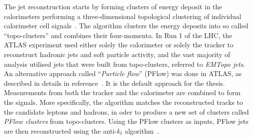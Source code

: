 The jet reconstruction starts by forming clusters of energy deposit
in the calorimeters performing a three-dimensional topological clustering 
of individual calorimeter cell signals~\cite{Aad_2017}.
The algorithm clusters the energy deposits into so called ``topo-clusters'' 
and combines their four-momenta. 
In Run 1 of the LHC, the ATLAS experiment used either
solely the calorimeter or solely the tracker to reconstruct
hadronic jets and soft particle activity, 
and the vast majority of analysis utilised jets that were built 
from topo-clusters, referred to \textit{EMTopo jets}.
An alternative approach called ``\textit{Particle flow}'' (PFlow) was done
in ATLAS, as described in details in reference~\cite{PERF-2015-09}. 
It is the default approach for the thesis.
Measurements from both the tracker and the calorimeter 
are combined to form the signals. 
More specifically, the algorithm matches the reconstructed tracks
to the candidate leptons and hadrons, in oder to produce a new
set of clusters called \textit{PFlow clusters} from topo-clusters.
Using the PFlow clusters as inputs, PFlow jets are then reconstructed
using the anti-$k_t$ algorithm~\cite{Cacciari_2008}. 
